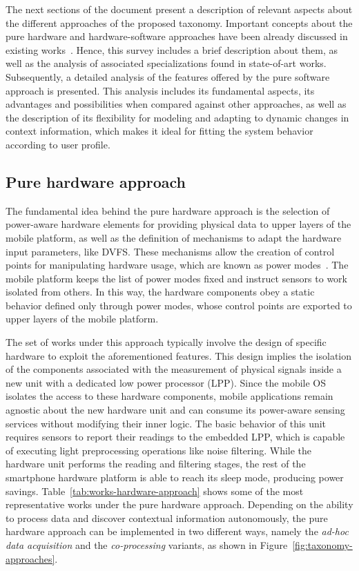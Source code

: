 \documentclass[12pt]{article}
\numberwithin{equation}{section}
\numberwithin{table}{section}
\numberwithin{figure}{section}
\begin{document}
The next sections of the document present a description of relevant aspects about the different approaches of the proposed taxonomy.
Important concepts about the pure hardware and hardware-software approaches have been already discussed in existing works~\cite{Priyantha2011,Ranganathan2010,Lorch1998,Benini2000}.
Hence, this survey includes a brief description about them, as well as the analysis of associated specializations found in state-of-art works.
Subsequently, a detailed analysis of the features offered by the pure software approach is presented.
This analysis includes its fundamental aspects, its advantages and possibilities when compared against other approaches, as well as the description of its flexibility for modeling and adapting to dynamic changes in context information, which makes it ideal for fitting the system behavior according to user profile.


\subsection{Pure hardware approach}
The fundamental idea behind the pure hardware approach is the selection of power-aware hardware elements for providing physical data to upper layers of the mobile platform, as well as the definition of mechanisms to adapt the hardware input parameters, like DVFS.
These mechanisms allow the creation of control points for manipulating hardware usage, which are known as power modes~\cite{Ranganathan2010,Lorch1998,Benini2000}.
The mobile platform keeps the list of power modes fixed and instruct sensors to work isolated from others.
In this way, the hardware components obey a static behavior defined only through power modes, whose control points are exported to upper layers of the mobile platform.

The set of works under this approach typically involve the design of specific hardware to exploit the aforementioned features.
This design implies the isolation of the components associated with the measurement of physical signals inside a new unit with a dedicated low power processor (LPP).
Since the mobile OS isolates the access to these hardware components, mobile applications remain agnostic about the new hardware unit and can consume its power-aware sensing services without modifying their inner logic.
The basic behavior of this unit requires sensors to report their readings to the embedded LPP, which is capable of executing light preprocessing operations like noise filtering.
While the hardware unit performs the reading and filtering stages, the rest of the smartphone hardware platform is able to reach its sleep mode, producing power savings.
Table~\ref{tab:works-hardware-approach} shows some of the most representative works under the pure hardware approach.
Depending on the ability to process data and discover contextual information autonomously, the pure hardware approach can be implemented in two different ways, namely the \emph{ad-hoc data acquisition} and the \emph{co-processing} variants, as shown in Figure~\ref{fig:taxonomy-approaches}.
\end{document}
